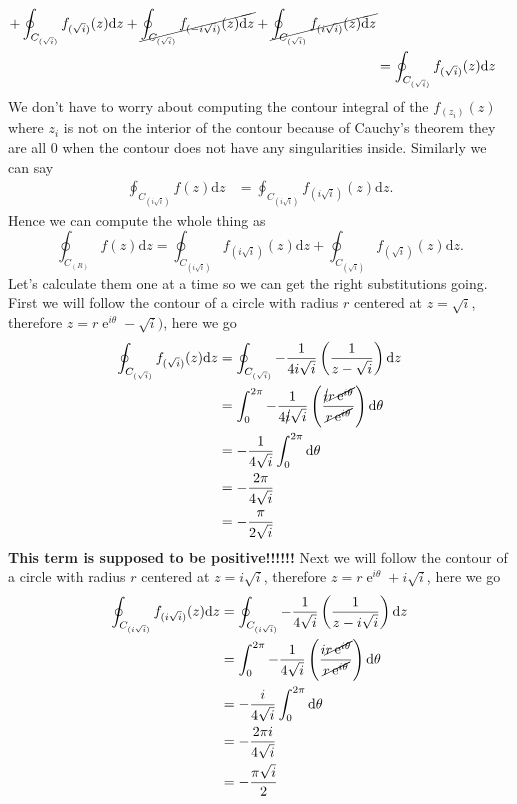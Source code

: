 \documentclass[10pt]{amsart}
\newcommand{\D}{\mathrm{d}}
\DeclareMathOperator{\E}{e}
\theoremstyle{nonumberplain}
\begin{document}
\begin{enumerate}[label={\bf {\arabic*}:}]
\begin{align*}
	+ \oint_{C_{(\sqrt{i})}} f_{(\sqrt{i})}(z) \D z
	+ \cancel{\oint_{C_{(\sqrt{i})}} f_{(-i\sqrt{i})}(z) \D z}
	+ \cancel{\oint_{C_{(\sqrt{i})}} f_{(i\sqrt{i})}(z) \D z} \\
	&= \oint_{C_{(\sqrt{i})}} f_{(\sqrt{i})}(z) \D z
\end{align*}
We don't have to worry about computing the contour integral of the $f_{(z_i)}(z)$ where $z_i$ is not on the interior of the contour because of Cauchy's theorem they are all $0$ when the contour does not have any singularities inside.
Similarly we can say 
\begin{align*}
\oint_{C_{(i\sqrt{i})}} f(z) \D z &= \oint_{C_{(i\sqrt{i})}} f_{(i\sqrt{i})}(z) \D z.
\end{align*}
Hence we can compute the whole thing as
$$
\oint_{C_{(R)}} f(z) \D z = \oint_{C_{(i\sqrt{i})}} f_{(i\sqrt{i})}(z) \D z + \oint_{C_{(\sqrt{i})}} f_{(\sqrt{i})}(z) \D z.
$$
Let's calculate them one at a time so we can get the right substitutions going.
First we will follow the contour of a circle with radius $r$ centered at $z = \sqrt{i}$, therefore $z = r\E^{i\theta} - \sqrt{i})$, here we go
\begin{align*}
\oint_{C_{(\sqrt{i})}} f_{(\sqrt{i})}(z) \D z &= \oint_{C_{(\sqrt{i})}} - \frac{1}{4i\sqrt{i}}\left(\frac{1}{z - \sqrt{i}} \right) \D z \\
	&= \int_0^{2\pi} - \frac{1}{4\cancel{i}\sqrt{i}}\left(\frac{\cancel{i}\cancel{r\E^{i\theta}}}{\cancel{r\E^{i\theta}}} \right) \D \theta \\
	&= - \frac{1}{4\sqrt{i}} \int_0^{2\pi} \D \theta \\
	&= - \frac{2 \pi}{4\sqrt{i}} \\
	&= - \frac{\pi}{2\sqrt{i}} \\
\end{align*}
\textbf{This term is supposed to be positive!!!!!!}
Next we will follow the contour of a circle with radius $r$ centered at $z = i\sqrt{i}$, therefore $z = r\E^{i\theta} + i\sqrt{i}$, here we go
\begin{align*}
\oint_{C_{(i\sqrt{i})}} f_{(i\sqrt{i})}(z) \D z &= \oint_{C_{(i\sqrt{i})}} -\frac{1}{4\sqrt{i}}\left(\frac{1}{z - i\sqrt{i}} \right) \D z \\
	&= \int_0^{2\pi} - \frac{1}{4\sqrt{i}}\left(\frac{i\cancel{r\E^{i\theta}}}{\cancel{r\E^{i\theta}}} \right) \D \theta \\
	&= - \frac{i}{4\sqrt{i}} \int_0^{2\pi}  \D \theta \\
	&= - \frac{2\pi i}{4\sqrt{i}} \\
	&= - \frac{\pi \sqrt{i}}{2} \\
\end{align*}


\end{enumerate}
\end{document}
